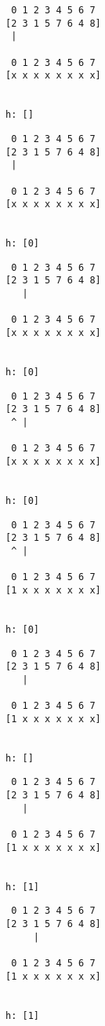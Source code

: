 { \begin{verbatim}
 0 1 2 3 4 5 6 7
[2 3 1 5 7 6 4 8]
 |

 0 1 2 3 4 5 6 7
[x x x x x x x x]


h: []
\end{verbatim} }

{ \begin{verbatim}
 0 1 2 3 4 5 6 7
[2 3 1 5 7 6 4 8]
 |

 0 1 2 3 4 5 6 7
[x x x x x x x x]


h: [0]
\end{verbatim} }

{ \begin{verbatim}
 0 1 2 3 4 5 6 7
[2 3 1 5 7 6 4 8]
   |

 0 1 2 3 4 5 6 7
[x x x x x x x x]


h: [0]
\end{verbatim} }

{ \begin{verbatim}
 0 1 2 3 4 5 6 7
[2 3 1 5 7 6 4 8]
 ^ |

 0 1 2 3 4 5 6 7
[x x x x x x x x]


h: [0]
\end{verbatim} }

{ \begin{verbatim}
 0 1 2 3 4 5 6 7
[2 3 1 5 7 6 4 8]
 ^ |

 0 1 2 3 4 5 6 7
[1 x x x x x x x]


h: [0]
\end{verbatim} }

{ \begin{verbatim}
 0 1 2 3 4 5 6 7
[2 3 1 5 7 6 4 8]
   |

 0 1 2 3 4 5 6 7
[1 x x x x x x x]


h: []
\end{verbatim} }

{ \begin{verbatim}
 0 1 2 3 4 5 6 7
[2 3 1 5 7 6 4 8]
   |

 0 1 2 3 4 5 6 7
[1 x x x x x x x]


h: [1]
\end{verbatim} }

{ \begin{verbatim}
 0 1 2 3 4 5 6 7
[2 3 1 5 7 6 4 8]
     |

 0 1 2 3 4 5 6 7
[1 x x x x x x x]


h: [1]
\end{verbatim} }

